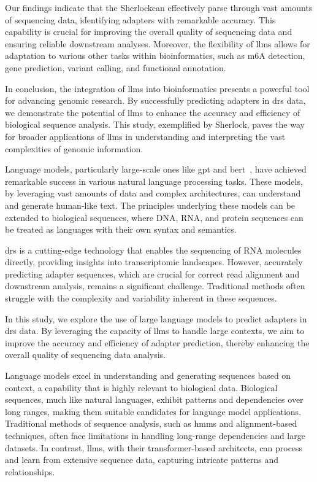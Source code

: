 \documentclass[pdflatex, sn-mathphys-num, lineno]{sn-jnl}%
\newcommand{\chopper}{Sherlock}
\theoremstyle{thmstyleone}%
\theoremstyle{thmstyletwo}%
\theoremstyle{thmstylethree}%
\begin{document}
Our findings indicate that the \chopper can effectively parse through vast amounts of sequencing data, identifying adapters with remarkable accuracy.
This capability is crucial for improving the overall quality of sequencing data and ensuring reliable downstream analyses.
Moreover, the flexibility of \glspl{llm} allows for adaptation to various other tasks within bioinformatics, such as m6A detection, gene prediction, variant calling, and functional annotation.

In conclusion, the integration of \glspl{llm} into bioinformatics presents a powerful tool for advancing genomic research.
By successfully predicting adapters in \gls{drs} data, we demonstrate the potential of \glspl{llm} to enhance the accuracy and efficiency of biological sequence analysis.
This study, exemplified by \chopper, paves the way for broader applications of \glspl{llm} in understanding and interpreting the vast complexities of genomic information.

Language models, particularly large-scale ones like \gls{gpt} and \gls{bert}~\cite{devlin2018bert}, have achieved remarkable success in various natural language processing tasks.
These models, by leveraging vast amounts of data and complex architectures, can understand and generate human-like text.
The principles underlying these models can be extended to biological sequences, where DNA, RNA, and protein sequences can be treated as languages with their own syntax and semantics.

\gls{drs} is a cutting-edge technology that enables the sequencing of RNA molecules directly, providing insights into transcriptomic landscapes.
However, accurately predicting adapter sequences, which are crucial for correct read alignment and downstream analysis, remains a significant challenge.
Traditional methods often struggle with the complexity and variability inherent in these sequences.

In this study, we explore the use of large language models to predict adapters in \gls{drs} data.
By leveraging the capacity of \glspl{llm} to handle large contexts, we aim to improve the accuracy and efficiency of adapter prediction, thereby enhancing the overall quality of sequencing data analysis.


Language models excel in understanding and generating sequences based on context, a capability that is highly relevant to biological data.
Biological sequences, much like natural languages, exhibit patterns and dependencies over long ranges, making them suitable candidates for language model applications.
Traditional methods of sequence analysis, such as \glspl{hmm} and alignment-based techniques, often face limitations in handling long-range dependencies and large datasets.
In contrast, \glspl{llm}, with their transformer-based architects, can process and learn from extensive sequence data, capturing intricate patterns and relationships.
\end{document}
